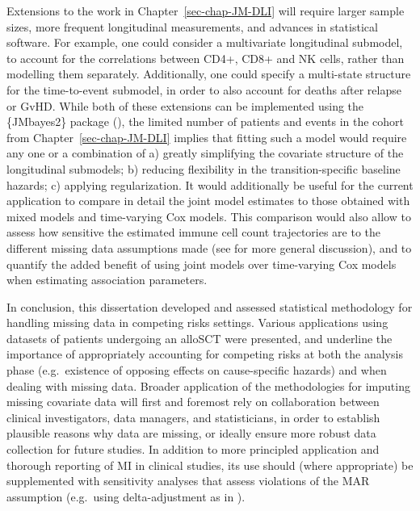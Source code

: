 \documentclass[
  letterpaper,
  DIV=11,
  numbers=noendperiod]{scrreprt}
\begin{document}
Extensions to the work in Chapter~\ref{sec-chap-JM-DLI} will require
larger sample sizes, more frequent longitudinal measurements, and
advances in statistical software. For example, one could consider a
multivariate longitudinal submodel, to account for the correlations
between CD4+, CD8+ and NK cells, rather than modelling them separately.
Additionally, one could specify a multi-state structure for the
time-to-event submodel, in order to also account for deaths after
relapse or GvHD. While both of these extensions can be implemented using
the \{JMbayes2\} package
(), the limited number of patients and events in the cohort
from Chapter~\ref{sec-chap-JM-DLI} implies that fitting such a model
would require any one or a combination of a) greatly simplifying the
covariate structure of the longitudinal submodels; b) reducing
flexibility in the transition-specific baseline hazards; c) applying
regularization. It would additionally be useful for the current
application to compare in detail the joint model estimates to those
obtained with mixed models and time-varying Cox models. This comparison
would also allow to assess how sensitive the estimated immune cell count
trajectories are to the different missing data assumptions made (see
 for more general discussion), and to quantify the added
benefit of using joint models over time-varying Cox models when
estimating association parameters.

In conclusion, this dissertation developed and assessed statistical
methodology for handling missing data in competing risks settings.
Various applications using datasets of patients undergoing an alloSCT
were presented, and underline the importance of appropriately accounting
for competing risks at both the analysis phase (e.g.~existence of
opposing effects on cause-specific hazards) and when dealing with
missing data. Broader application of the methodologies for imputing
missing covariate data will first and foremost rely on collaboration
between clinical investigators, data managers, and statisticians, in
order to establish plausible reasons why data are missing, or ideally
ensure more robust data collection for future studies. In addition to
more principled application and thorough reporting of MI in clinical
studies, its use should (where appropriate) be supplemented with
sensitivity analyses that assess violations of the MAR assumption
(e.g.~using delta-adjustment as in
).
\end{document}
